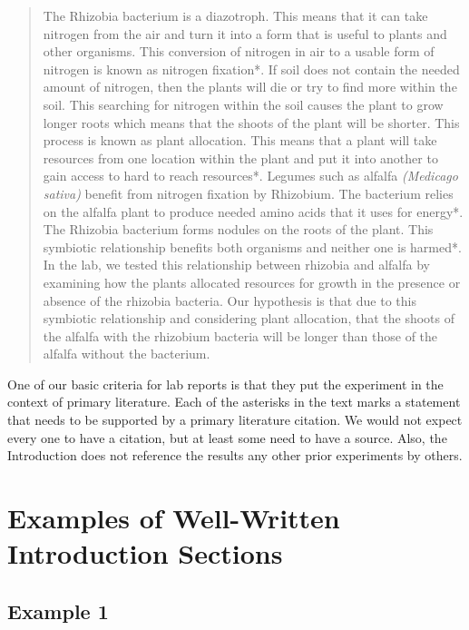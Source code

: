 \documentclass[
]{book}
\begin{document}
\begin{quote}
The Rhizobia bacterium is a diazotroph. This means that it can take nitrogen from the air and turn it into a form that is useful to plants and other organisms. This conversion of nitrogen in air to a usable form of nitrogen is known as nitrogen fixation*. If soil does not contain the needed amount of nitrogen, then the plants will die or try to find more within the soil. This searching for nitrogen within the soil causes the plant to grow longer roots which means that the shoots of the plant will be shorter. This process is known as plant allocation. This means that a plant will take resources from one location within the plant and put it into another to gain access to hard to reach resources*. Legumes such as alfalfa \emph{(Medicago sativa)} benefit from nitrogen fixation by Rhizobium. The bacterium relies on the alfalfa plant to produce needed amino acids that it uses for energy*. The Rhizobia bacterium forms nodules on the roots of the plant. This symbiotic relationship benefits both organisms and neither one is harmed*. In the lab, we tested this relationship between rhizobia and alfalfa by examining how the plants allocated resources for growth in the presence or absence of the rhizobia bacteria. Our hypothesis is that due to this symbiotic relationship and considering plant allocation, that the shoots of the alfalfa with the rhizobium bacteria will be longer than those of the alfalfa without the bacterium.
\end{quote}

One of our basic criteria for lab reports is that they put the experiment in the context of primary literature. Each of the asterisks in the text marks a statement that needs to be supported by a primary literature citation. We would not expect every one to have a citation, but at least some need to have a source. Also, the Introduction does not reference the results any other prior experiments by others.

\hypertarget{examples-of-well-written-introduction-sections}{%
\section{Examples of Well-Written Introduction Sections}\label{examples-of-well-written-introduction-sections}}

\hypertarget{example-1-3}{%
\subsection{Example 1}\label{example-1-3}}
\end{document}
